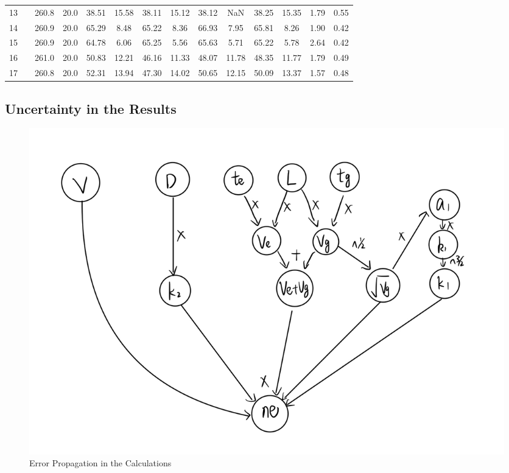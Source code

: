 \documentclass{article}
\begin{document}
\begin{table}
\begin{tabular}{c c c c c c c c c c c c c c}
13 & \vline & 260.8 & 20.0 & 38.51 & 15.58 & 38.11 & 15.12 & 38.12 & NaN & 38.25 & 15.35 & 1.79 & 0.55 \\
14 & \vline & 260.9 & 20.0 & 65.29 & 8.48 & 65.22 & 8.36 & 66.93 & 7.95 & 65.81 & 8.26 & 1.90 & 0.42 \\
15 & \vline & 260.9 & 20.0 & 64.78 & 6.06 & 65.25 & 5.56 & 65.63 & 5.71 & 65.22 & 5.78 & 2.64 & 0.42 \\
16 & \vline & 261.0 & 20.0 & 50.83 & 12.21 & 46.16 & 11.33 & 48.07 & 11.78 & 48.35 & 11.77 & 1.79 & 0.49 \\
17 & \vline & 260.8 & 20.0 & 52.31 & 13.94 & 47.30 & 14.02 & 50.65 & 12.15 & 50.09 & 13.37 & 1.57 & 0.48 \\
		
\hline\hline %
\end{tabular}
\label{tab:times} %
\end{table}

\subsection{Uncertainty in the Results}
\label{sec:uncertainty}

\begin{figure}
	\includegraphics[width=\columnwidth]{error.jpg}
    \caption{Error Propagation in the Calculations}
    \label{fig:error}
\end{figure}
\end{document}
